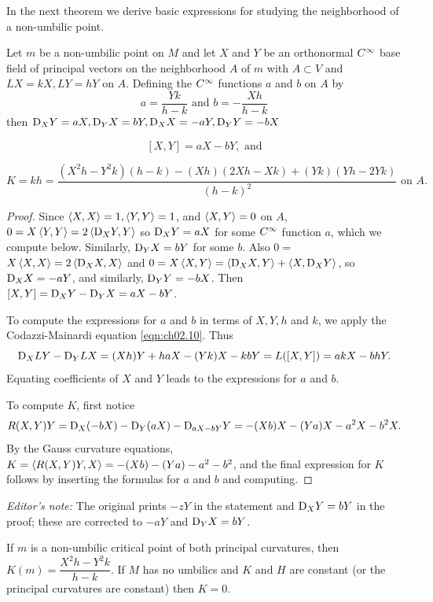 \documentclass[../main]{subfiles}
\begin{document}
In the next theorem we derive basic expressions for studying the neighborhood of a non-umbilic point.



\begin{theorem} \label{thm:ch3.1.2}
 
Let $m$ be a non-umbilic point on $M$ and let $X$ and $Y$ be an orthonormal $C^\infty$ base field of principal vectors on the neighborhood $A$ of $m$ with $A \subset V$ and $L X=k X, L Y=h Y$ on $A$. Defining the $C^\infty$ functions $a$ and $b$ on $A$ by
\[
a=\dfrac{Y k}{h-k} \text { and }  b=-\dfrac{X h}{h-k}
\]
then $\mathrm{D}_{X} Y=a X, \mathrm{D}_{Y} X=b Y, \mathrm{D}_{X} X=-a Y, \mathrm{D}_{Y} Y=-b X$

    

\[[X, Y]=a X-b Y, \text{ and}\]

\[K=k h=\frac{\left(X^{2} h-Y^{2} k\right)(h-k)-(X h)(2 X h-X k)+(Y k)(Y h-2 Y k)}{(h-k)^{2}}\text{ on } A.\]

\end{theorem} 

\begin{proof}

Since $\left\langle X, X\right\rangle=1,\left\langle Y, Y\right\rangle=1$, and $\left\langle X, Y\right\rangle=0$ on $A$, \newline $0= X\left\langle Y,Y\right\rangle=2\left\langle\mathrm{D}_{X} Y,Y\right\rangle$ so $\mathrm{D}_{X} Y=a X$ for some $C^\infty$ function $a$, whìch we compute below. Similarly, $\mathrm{D}_{Y} X=b Y$ for some $b$. Also \newline $0=$ $X\left\langle X, X\right\rangle=2\left\langle \mathrm{D}_{X} X, X\right\rangle$ and $0=X\left\langle X, Y\right\rangle=\left\langle \mathrm{D}_{X} X, Y\right\rangle+\left\langle X, \mathrm{D}_{X} Y\right\rangle$, so $\mathrm{D}_{X} X=-a Y$, and similarly, $\mathrm{D}_{Y} Y=-b X$. Then $[X, Y]=\mathrm{D}_{X} Y-\mathrm{D}_{Y} X= a X-b Y$.

To compute the expressions for $a$ and $b$ in terms of $X, Y, h$ and $k$, we apply the Codazzi-Mainardi equation \ref{eqn:ch02.10}. Thus \[\mathrm{D}_{X} L Y-\mathrm{D}_{Y} L X=(X h) Y+h a X-(Y k) X-k b Y=L([X, Y])=a k X-b h Y.\] Equating coefficients of $X$ and $Y$ leads to the expressions for $a$ and $b$.

To compute $K$, first notice \[R(X, Y) Y=\mathrm{D}_{X}(-b X)-\mathrm{D}_{Y}(a X)-\mathrm{D}_{a X-b Y} Y=-(X b) X-(Y a) X-a^{2} X-b^{2} X .\] By the Gauss curvature equations, $K=\left\langle R(X, Y) Y,X\right\rangle=-(X b)-(Y a)-a^{2}-b^{2}$, and the final expression for $K$ follows by inserting the formulas for $a$ and $b$ and computing.

\end{proof}
\noindent\emph{Editor's note:} The original prints $-zY$ in the statement and $\mathrm{D}_XY=bY$ in the proof; these are corrected to $-aY$ and $\mathrm{D}_YX=bY$.




\begin{corollary} \label{cor:ch3.1.3}

If $m$ is a non-umbilic critical point of both principal curvatures, then $K(m)=\dfrac{X^{2} h-Y^{2} k}{ h-k}$. If $M$ has no umbilics and $K$ and $H$ are constant (or the principal curvatures are constant) then $K=0$.
\end{corollary} 
\end{document}

